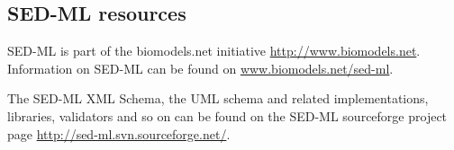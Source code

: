 \subsection{SED-ML resources}

SED-ML is part of the biomodels.net initiative \url{http://www.biomodels.net}. Information on SED-ML can be found on \url{www.biomodels.net/sed-ml}.

The SED-ML XML Schema, the UML schema and related implementations, libraries, validators and so on can be found on the SED-ML sourceforge project page \url{http://sed-ml.svn.sourceforge.net/}.



